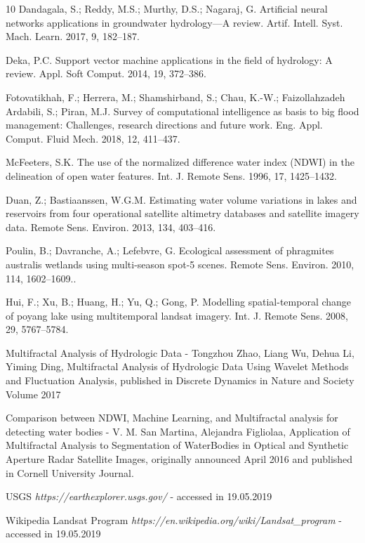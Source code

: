 \documentclass[12pt, a4paper]{report}
\begin{document}
\begin{thebibliography} {10}
Dandagala, S.; Reddy, M.S.; Murthy, D.S.; Nagaraj, G. Artificial neural networks applications in groundwater hydrology—A review. Artif. Intell. Syst. Mach. Learn. 2017, 9, 182–187.

Deka, P.C. Support vector machine applications in the field of hydrology: A review. Appl. Soft Comput. 2014,
19, 372–386.

Fotovatikhah, F.; Herrera, M.; Shamshirband, S.; Chau, K.-W.; Faizollahzadeh Ardabili, S.; Piran, M.J. Survey of computational intelligence as basis to big flood management: Challenges, research directions and future work. Eng. Appl. Comput. Fluid Mech. 2018, 12, 411–437. 

McFeeters, S.K. The use of the normalized difference water index (NDWI) in the delineation of open water features. Int. J. Remote Sens. 1996, 17, 1425–1432.

Duan, Z.; Bastiaanssen, W.G.M. Estimating water volume variations in lakes and reservoirs from four operational satellite altimetry databases and satellite imagery data. Remote Sens. Environ. 2013, 134, 403–416.

Poulin, B.; Davranche, A.; Lefebvre, G. Ecological assessment of phragmites australis wetlands using multi-season spot-5 scenes. Remote Sens. Environ. 2010, 114, 1602–1609..

Hui, F.; Xu, B.; Huang, H.; Yu, Q.; Gong, P. Modelling spatial-temporal change of poyang lake using multitemporal landsat imagery. Int. J. Remote Sens. 2008, 29, 5767–5784.

Multifractal Analysis of Hydrologic Data -
Tongzhou Zhao, Liang Wu, Dehua Li, Yiming Ding, Multifractal Analysis of Hydrologic Data Using Wavelet Methods and Fluctuation Analysis, published in Discrete Dynamics in Nature and Society
Volume 2017

Comparison between NDWI, Machine Learning, and Multifractal analysis for detecting water bodies -  
V. M. San Martina, Alejandra Figliolaa, Application of Multifractal Analysis to Segmentation of WaterBodies in Optical and Synthetic Aperture Radar Satellite Images, originally announced April 2016 and published in Cornell University Journal.

USGS \textit{https://earthexplorer.usgs.gov/} - accessed in 19.05.2019


Wikipedia Landsat Program \textit{https://en.wikipedia.org/wiki/Landsat\_program} - accessed in 19.05.2019


\end{thebibliography}
\end{document}
